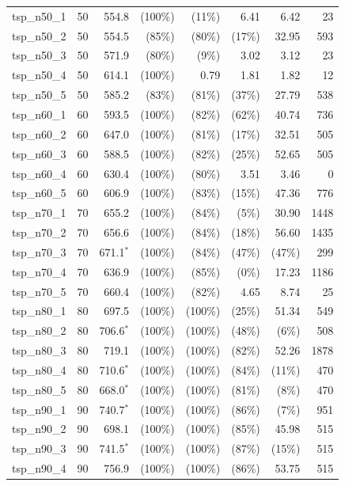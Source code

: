 \begin{longtable}{lrrrrrrr}
tsp\_n50\_1 & 50 & 554.8 & (100\%) & (11\%) & 6.41 & 6.42 & 23 \\
tsp\_n50\_2 & 50 & 554.5 & (85\%) & (80\%) & (17\%) & 32.95 & 593 \\
tsp\_n50\_3 & 50 & 571.9 & (80\%) & (9\%) & 3.02 & 3.12 & 23 \\
tsp\_n50\_4 & 50 & 614.1 & (100\%) & 0.79 & 1.81 & 1.82 & 12 \\
tsp\_n50\_5 & 50 & 585.2 & (83\%) & (81\%) & (37\%) & 27.79 & 538 \\
tsp\_n60\_1 & 60 & 593.5 & (100\%) & (82\%) & (62\%) & 40.74 & 736 \\
tsp\_n60\_2 & 60 & 647.0 & (100\%) & (81\%) & (17\%) & 32.51 & 505 \\
tsp\_n60\_3 & 60 & 588.5 & (100\%) & (82\%) & (25\%) & 52.65 & 505 \\
tsp\_n60\_4 & 60 & 630.4 & (100\%) & (80\%) & 3.51 & 3.46 & 0 \\
tsp\_n60\_5 & 60 & 606.9 & (100\%) & (83\%) & (15\%) & 47.36 & 776 \\
tsp\_n70\_1 & 70 & 655.2 & (100\%) & (84\%) & (5\%) & 30.90 & 1448 \\
tsp\_n70\_2 & 70 & 656.6 & (100\%) & (84\%) & (18\%) & 56.60 & 1435 \\
tsp\_n70\_3 & 70 & 671.1$^*$ & (100\%) & (84\%) & (47\%) & (47\%) & 299 \\
tsp\_n70\_4 & 70 & 636.9 & (100\%) & (85\%) & (0\%) & 17.23 & 1186 \\
tsp\_n70\_5 & 70 & 660.4 & (100\%) & (82\%) & 4.65 & 8.74 & 25 \\
tsp\_n80\_1 & 80 & 697.5 & (100\%) & (100\%) & (25\%) & 51.34 & 549 \\
tsp\_n80\_2 & 80 & 706.6$^*$ & (100\%) & (100\%) & (48\%) & (6\%) & 508 \\
tsp\_n80\_3 & 80 & 719.1 & (100\%) & (100\%) & (82\%) & 52.26 & 1878 \\
tsp\_n80\_4 & 80 & 710.6$^*$ & (100\%) & (100\%) & (84\%) & (11\%) & 470 \\
tsp\_n80\_5 & 80 & 668.0$^*$ & (100\%) & (100\%) & (81\%) & (8\%) & 470 \\
tsp\_n90\_1 & 90 & 740.7$^*$ & (100\%) & (100\%) & (86\%) & (7\%) & 951 \\
tsp\_n90\_2 & 90 & 698.1 & (100\%) & (100\%) & (85\%) & 45.98 & 515 \\
tsp\_n90\_3 & 90 & 741.5$^*$ & (100\%) & (100\%) & (87\%) & (15\%) & 515 \\
tsp\_n90\_4 & 90 & 756.9 & (100\%) & (100\%) & (86\%) & 53.75 & 515 \\

\end{longtable}
